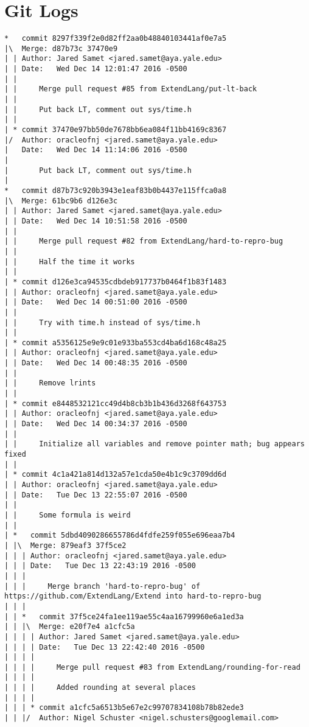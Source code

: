 \medskip \noindent
\chapter{Git Logs}
\begin{lstlisting}
*   commit 8297f339f2e0d82ff2aa0b48840103441af0e7a5
|\  Merge: d87b73c 37470e9
| | Author: Jared Samet <jared.samet@aya.yale.edu>
| | Date:   Wed Dec 14 12:01:47 2016 -0500
| | 
| |     Merge pull request #85 from ExtendLang/put-lt-back
| |     
| |     Put back LT, comment out sys/time.h
| |   
| * commit 37470e97bb50de7678bb6ea084f11bb4169c8367
|/  Author: oracleofnj <jared.samet@aya.yale.edu>
|   Date:   Wed Dec 14 11:14:06 2016 -0500
|   
|       Put back LT, comment out sys/time.h
|    
*   commit d87b73c920b3943e1eaf83b0b4437e115ffca0a8
|\  Merge: 61bc9b6 d126e3c
| | Author: Jared Samet <jared.samet@aya.yale.edu>
| | Date:   Wed Dec 14 10:51:58 2016 -0500
| | 
| |     Merge pull request #82 from ExtendLang/hard-to-repro-bug
| |     
| |     Half the time it works
| |   
| * commit d126e3ca94535cdbdeb917737b0464f1b83f1483
| | Author: oracleofnj <jared.samet@aya.yale.edu>
| | Date:   Wed Dec 14 00:51:00 2016 -0500
| | 
| |     Try with time.h instead of sys/time.h
| |   
| * commit a5356125e9e9c01e933ba553cd4ba6d168c48a25
| | Author: oracleofnj <jared.samet@aya.yale.edu>
| | Date:   Wed Dec 14 00:48:35 2016 -0500
| | 
| |     Remove lrints
| |   
| * commit e8448532121cc49d4b8cb3b1b436d3268f643753
| | Author: oracleofnj <jared.samet@aya.yale.edu>
| | Date:   Wed Dec 14 00:34:37 2016 -0500
| | 
| |     Initialize all variables and remove pointer math; bug appears fixed
| |   
| * commit 4c1a421a814d132a57e1cda50e4b1c9c3709dd6d
| | Author: oracleofnj <jared.samet@aya.yale.edu>
| | Date:   Tue Dec 13 22:55:07 2016 -0500
| | 
| |     Some formula is weird
| |     
| *   commit 5dbd4090286655786d4fdfe259f055e696eaa7b4
| |\  Merge: 879eaf3 37f5ce2
| | | Author: oracleofnj <jared.samet@aya.yale.edu>
| | | Date:   Tue Dec 13 22:43:19 2016 -0500
| | | 
| | |     Merge branch 'hard-to-repro-bug' of https://github.com/ExtendLang/Extend into hard-to-repro-bug
| | |      
| | *   commit 37f5ce24fa1ee119ae55c4aa16799960e6a1ed3a
| | |\  Merge: e20f7e4 a1cfc5a
| | | | Author: Jared Samet <jared.samet@aya.yale.edu>
| | | | Date:   Tue Dec 13 22:42:40 2016 -0500
| | | | 
| | | |     Merge pull request #83 from ExtendLang/rounding-for-read
| | | |     
| | | |     Added rounding at several places
| | | |     
| | | * commit a1cfc5a6513b5e67e2c99707834108b78b82ede3
| | |/  Author: Nigel Schuster <nigel.schusters@googlemail.com>

\end{lstlisting}
